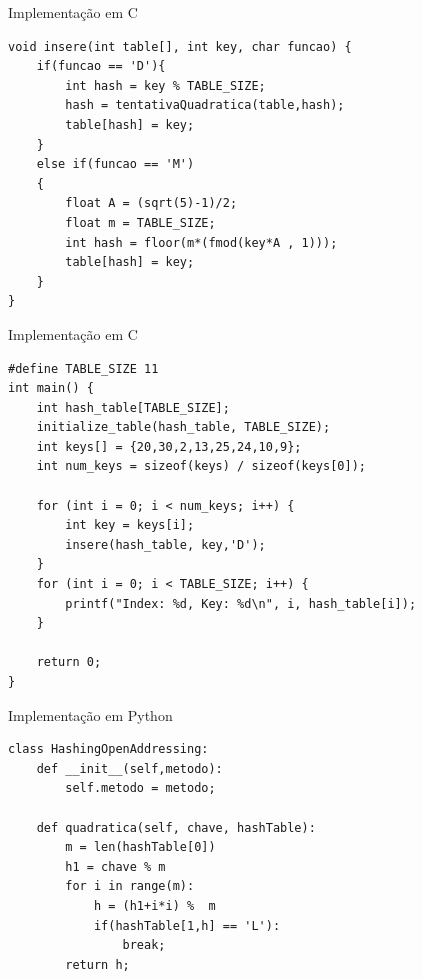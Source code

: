\documentclass{beamer}
\begin{document}
\begin{frame}[fragile]{Implementação em C}
\begin{lstlisting}[style=CStyle]
void insere(int table[], int key, char funcao) {
    if(funcao == 'D'){
        int hash = key % TABLE_SIZE;
        hash = tentativaQuadratica(table,hash);
        table[hash] = key;
    }
    else if(funcao == 'M')
    {
        float A = (sqrt(5)-1)/2;
        float m = TABLE_SIZE;
        int hash = floor(m*(fmod(key*A , 1)));
        table[hash] = key;
    }
}
\end{lstlisting}
\end{frame}

\begin{frame}[fragile]{Implementação em C}
\footnotesize
\begin{lstlisting}[style=CStyle]
#define TABLE_SIZE 11
int main() {
    int hash_table[TABLE_SIZE];
    initialize_table(hash_table, TABLE_SIZE);
    int keys[] = {20,30,2,13,25,24,10,9};
    int num_keys = sizeof(keys) / sizeof(keys[0]);

    for (int i = 0; i < num_keys; i++) {
        int key = keys[i];
        insere(hash_table, key,'D');
    }
    for (int i = 0; i < TABLE_SIZE; i++) {
        printf("Index: %d, Key: %d\n", i, hash_table[i]);
    }

    return 0;
}

\end{lstlisting}
\end{frame}


\begin{frame}[fragile]{Implementação em Python} 
\centering\footnotesize
\begin{lstlisting}[style=PythonStyle]
  class HashingOpenAddressing:
    def __init__(self,metodo):
        self.metodo = metodo;

    def quadratica(self, chave, hashTable):
        m = len(hashTable[0])
        h1 = chave % m
        for i in range(m):
            h = (h1+i*i) %  m
            if(hashTable[1,h] == 'L'):
                break;
        return h;
\end{lstlisting}
\end{frame}
\end{document}
